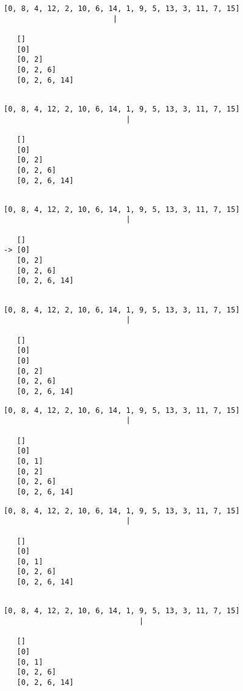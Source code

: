 { \begin{verbatim}
[0, 8, 4, 12, 2, 10, 6, 14, 1, 9, 5, 13, 3, 11, 7, 15]
                         |

   []
   [0]
   [0, 2]
   [0, 2, 6]
   [0, 2, 6, 14]


\end{verbatim} }

{ \begin{verbatim}
[0, 8, 4, 12, 2, 10, 6, 14, 1, 9, 5, 13, 3, 11, 7, 15]
                            |

   []
   [0]
   [0, 2]
   [0, 2, 6]
   [0, 2, 6, 14]


\end{verbatim} }

{ \begin{verbatim}
[0, 8, 4, 12, 2, 10, 6, 14, 1, 9, 5, 13, 3, 11, 7, 15]
                            |

   []
-> [0]
   [0, 2]
   [0, 2, 6]
   [0, 2, 6, 14]


\end{verbatim} }

{ \begin{verbatim}
[0, 8, 4, 12, 2, 10, 6, 14, 1, 9, 5, 13, 3, 11, 7, 15]
                            |

   []
   [0]
   [0]
   [0, 2]
   [0, 2, 6]
   [0, 2, 6, 14]

\end{verbatim} }

{ \begin{verbatim}
[0, 8, 4, 12, 2, 10, 6, 14, 1, 9, 5, 13, 3, 11, 7, 15]
                            |

   []
   [0]
   [0, 1]
   [0, 2]
   [0, 2, 6]
   [0, 2, 6, 14]

\end{verbatim} }

{ \begin{verbatim}
[0, 8, 4, 12, 2, 10, 6, 14, 1, 9, 5, 13, 3, 11, 7, 15]
                            |

   []
   [0]
   [0, 1]
   [0, 2, 6]
   [0, 2, 6, 14]


\end{verbatim} }

{ \begin{verbatim}
[0, 8, 4, 12, 2, 10, 6, 14, 1, 9, 5, 13, 3, 11, 7, 15]
                               |

   []
   [0]
   [0, 1]
   [0, 2, 6]
   [0, 2, 6, 14]


\end{verbatim} }

